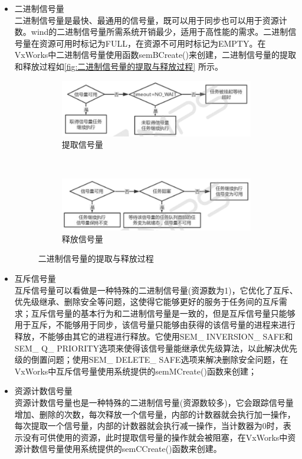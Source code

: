 \begin{itemize}
\item 二进制信号量\\
	二进制信号量是最快、最通用的信号量，既可以用于同步也可以用于资源计数。wind的二进制信号量所需系统开销最少，适用于高性能的需求。二进制信号量在资源可用时标记为FULL，在资源不可用时标记为EMPTY。在VxWorks中二进制信号量使用函数semBCreate()来创建，二进制信号量的提取和释放过程如\autoref{fig:二进制信号量的提取与释放过程} 所示。

\begin{figure}[h]
\centering
  \begin{subfigure}[b]{1.0\textwidth}
  \includegraphics[width=\textwidth]{./graphics/erjinzhiTiQu.pdf}
  \caption{提取信号量}\label{fig:cp2102Front}
  \end{subfigure}
  ~
  \begin{subfigure}[b]{1.0\textwidth}
  \includegraphics[width=\textwidth]{./graphics/erjinzhiShiFang.pdf}
  \caption{释放信号量}\label{fig:cp2102Rear}
  \end{subfigure}
\caption{二进制信号量的提取与释放过程}\label{fig:二进制信号量的提取与释放过程}
\end{figure} 


\item 互斥信号量\\
	互斥信号量可以看做是一种特殊的二进制信号量(资源数为1)，它优化了互斥、优先级继承、删除安全等问题，这使得它能够更好的服务于任务间的互斥需求；互斥信号量的基本行为和二进制信号量是一致的，但是互斥信号量只能够用于互斥，不能够用于同步，该信号量只能够由获得的该信号量的进程来进行释放，不能够由其它的进程进行释放。它使用SEM\_ INVERSION\_ SAFE和SEM\_ Q\_ PRIORITY选项来使得该信号量能继承优先级算法，以此解决优先级的倒置问题；使用SEM\_ DELETE\_ SAFE选项来解决删除安全问题，在VxWorks中互斥信号量使用系统提供的semMCreate()函数来创建；
	
\item 资源计数信号量\\
	资源计数信号量也是一种特殊的二进制信号量(资源数较多)，它会跟踪信号量增加、删除的次数，每次释放一个信号量，内部的计数器就会执行加一操作，每次提取一个信号量，内部的计数器就会执行减一操作，当计数器为0时，表示没有可供使用的资源，此时提取信号量的操作就会被阻塞，在VxWorks中资源计数信号量使用系统提供的semCCreate()函数来创建。

\end{itemize}
	
